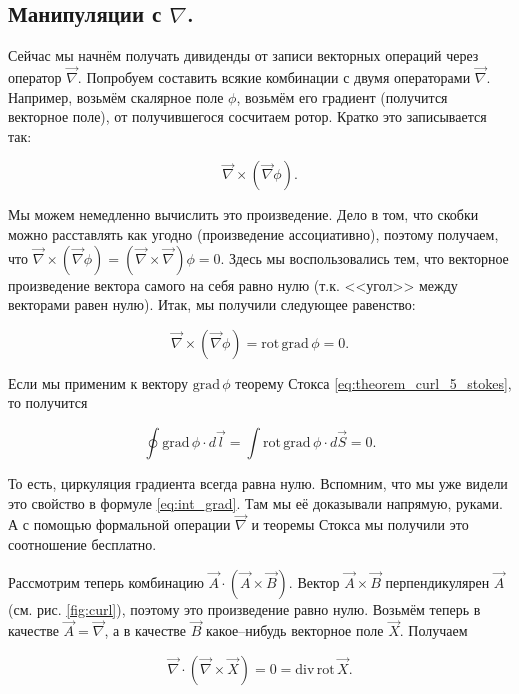 \documentclass[12pt,a4paper]{article}
\numberwithin{equation}{section}
\numberwithin{equation}{section}
\newcommand{\grad}{\mathrm{grad}\,}
\newcommand{\rot}{\mathrm{rot}\,}
\renewcommand{\div}{\mathrm{div}\,}
\newcommand{\vn}{\vec{\nabla}}
\begin{document}
\subsection{Манипуляции с $\nabla$.}
\label{sec:nabla}

Сейчас мы начнём получать дивиденды от записи векторных операций через
оператор $\vn$. Попробуем составить всякие комбинации с двумя
операторами $\vn$. Например, возьмём скалярное поле $\phi$, возьмём
его градиент (получится векторное поле), от получившегося сосчитаем
ротор. Кратко это записывается так:

\begin{equation}
  \vn \times (\vn \phi).
\end{equation}

Мы можем немедленно вычислить это произведение. Дело в том, что скобки
можно расставлять как угодно (произведение ассоциативно), поэтому
получаем, что $\vn \times (\vn \phi) = (\vn \times \vn) \phi
=0$. Здесь мы воспользовались тем, что векторное произведение вектора
самого на себя равно нулю (т.к. <<угол>> между векторами равен
нулю). Итак, мы получили следующее равенство: 

\begin{equation}
  \label{eq:rot_grad}
  \vn \times (\vn \phi) = \rot \grad \phi = 0.
\end{equation}

Если мы применим к вектору $\grad \phi$ теорему Стокса
\eqref{eq:theorem_curl_5_stokes}, то получится

\begin{equation}
  \label{eq:stokes_gradient}
  \oint \grad \phi \cdot d\vec{l} = \int \rot \grad \phi \cdot
  d\vec{S} = 0.
\end{equation}

То есть, циркуляция градиента всегда равна нулю. Вспомним, что мы уже
видели это свойство в формуле \eqref{eq:int_grad}. Там мы её
доказывали напрямую, руками. А с помощью формальной операции $\vn$ и
теоремы Стокса мы получили это соотношение бесплатно.

Рассмотрим теперь комбинацию $ \vec{A} \cdot (\vec{A} \times
\vec{B})$. Вектор $\vec{A} \times \vec{B}$ перпендикулярен $\vec{A}$
(см. рис. \ref{fig:curl}), поэтому это произведение равно
нулю. Возьмём теперь в качестве $\vec{A} = \vn$, а в качестве
$\vec{B}$ какое--нибудь векторное поле $\vec{X}$. Получаем

\begin{equation}
  \label{eq:div_rot}
  \vn \cdot (\vn \times \vec{X}) = 0 = \div \rot \vec{X}.
\end{equation}
\end{document}
